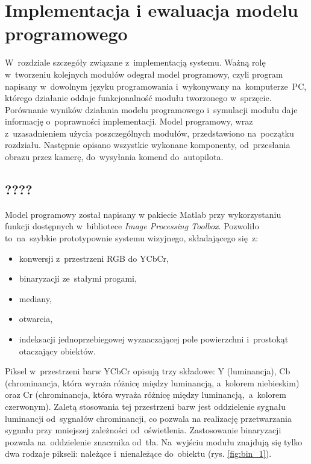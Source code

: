 \chapter{Implementacja i ewaluacja modelu programowego}
\label{cha:opis_implementacji}

W~rozdziale szczegóły związane z~implementacją systemu. 
Ważną rolę w~tworzeniu kolejnych modułów odegrał model programowy, czyli program napisany w~dowolnym języku programowania i~wykonywany na~komputerze~PC, którego działanie oddaje funkcjonalność modułu tworzonego w~sprzęcie.
Porównanie wyników działania modelu programowego i~symulacji modułu daje informację o~poprawności implementacji. 
Model programowy, wraz z~uzasadnieniem użycia poszczególnych modułów, przedstawiono na~początku rozdziału.
Następnie opisano wszystkie wykonane komponenty, od~przesłania obrazu przez kamerę, do~wysyłania komend do~autopilota.

\section{????}
\label{sec:implementacja_modelu_programowego}
Model programowy został napisany w pakiecie Matlab przy wykorzystaniu funkcji dostępnych w~bibliotece \textit{Image Processing Toolbox}. 
Pozwoliło to~na~szybkie prototypownie systemu wizyjnego, składającego się~z:
\begin{itemize}
	\item konwersji z~przestrzeni RGB do YCbCr,
	\item binaryzacji ze~stałymi progami,
	\item mediany,
	\item otwarcia,
	\item indeksacji jednoprzebiegowej wyznaczającej pole powierzchni i~prostokąt otaczający obiektów.
\end{itemize}

Piksel w~przestrzeni barw YCbCr opisują trzy składowe: Y (luminancja), Cb (chrominancja, która wyraża różnicę między luminancją, a~kolorem niebieskim) oraz Cr (chrominancja, która wyraża różnicę między luminancją,~a~kolorem czerwonym). 
Zaletą stosowania tej przestrzeni barw jest oddzielenie sygnału luminancji od~sygnałów chrominancji, co pozwala na realizację przetwarzania sygnału przy mniejszej zależności od~oświetlenia.
Zastosowanie binaryzacji pozwala na~oddzielenie znacznika od~tła. 
Na~wyjściu modułu znajdują się tylko dwa rodzaje pikseli: należące i~nienależące do~obiektu (rys. \ref{fig:bin_1}).

